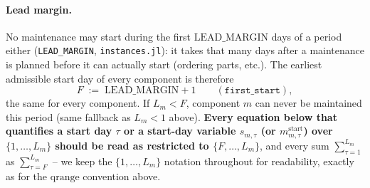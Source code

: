 \documentclass[11pt]{article}
\begin{document}
\paragraph{Lead margin.} No maintenance may start during the first $\mathrm{LEAD\_MARGIN}$
days of a period either (\texttt{LEAD\_MARGIN}, \texttt{instances.jl}): it takes that many
days after a maintenance is planned before it can actually start (ordering parts, etc.).
The earliest admissible start day of every component is therefore
\[
  F \;:=\; \mathrm{LEAD\_MARGIN} + 1 \qquad (\texttt{first\_start}),
\]
the same for every component. If $L_m < F$, component $m$ can never be maintained this
period (same fallback as $L_m < 1$ above). \textbf{Every equation below that quantifies a
start day $\tau$ or a start-day variable $s_{m,\tau}$ (or $m^{\mathrm{start}}_{m,\tau}$)
over $\{1,\dots,L_m\}$ should be read as restricted to $\{F,\dots,L_m\}$}, and every sum
$\sum_{\tau=1}^{L_m}$ as $\sum_{\tau=F}^{L_m}$ -- we keep the $\{1,\dots,L_m\}$ notation
throughout for readability, exactly as for the $\mathrm{qrange}$ convention above.
\end{document}
